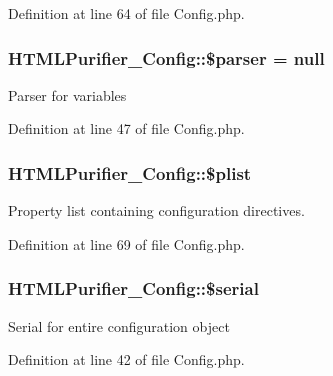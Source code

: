 Definition at line 64 of file Config.\+php.

\hypertarget{classHTMLPurifier__Config_a4b3bfa5d185c17c911db346bbf1cfb49}{
\subsubsection[{\$parser}]{\setlength{\rightskip}{0pt plus 5cm}H\+T\+M\+L\+Purifier\+\_\+\+Config\+::\$parser = null\hspace{0.3cm}{\ttfamily [protected]}}}\label{classHTMLPurifier__Config_a4b3bfa5d185c17c911db346bbf1cfb49}
Parser for variables 

Definition at line 47 of file Config.\+php.

\hypertarget{classHTMLPurifier__Config_a11e37c608d947d71495b700b2e350e1c}{
\subsubsection[{\$plist}]{\setlength{\rightskip}{0pt plus 5cm}H\+T\+M\+L\+Purifier\+\_\+\+Config\+::\$plist\hspace{0.3cm}{\ttfamily [protected]}}}\label{classHTMLPurifier__Config_a11e37c608d947d71495b700b2e350e1c}
Property list containing configuration directives. 

Definition at line 69 of file Config.\+php.

\hypertarget{classHTMLPurifier__Config_a69593d42c4c4f7a9c285ac2bf892fa15}{
\subsubsection[{\$serial}]{\setlength{\rightskip}{0pt plus 5cm}H\+T\+M\+L\+Purifier\+\_\+\+Config\+::\$serial\hspace{0.3cm}{\ttfamily [protected]}}}\label{classHTMLPurifier__Config_a69593d42c4c4f7a9c285ac2bf892fa15}
Serial for entire configuration object 

Definition at line 42 of file Config.\+php.


